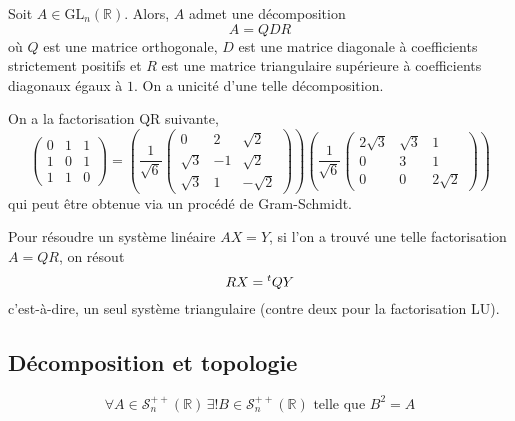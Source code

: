   \begin{corollary}
    Soit $A \in \mathrm{GL}_n(\mathbb{R})$. Alors, $A$ admet une décomposition
    \[ A = QDR \]
    où $Q$ est une matrice orthogonale, $D$ est une matrice diagonale à coefficients strictement positifs et $R$ est une matrice triangulaire supérieure à coefficients diagonaux égaux à $1$. On a unicité d'une telle décomposition.
  \end{corollary}
  
  
  \begin{example}
    On a la factorisation QR suivante,
    \[ \begin{pmatrix} 0 & 1 & 1 \\ 1 & 0 & 1 \\ 1 & 1 & 0 \end{pmatrix} = \left( \frac{1}{\sqrt{6}} \begin{pmatrix} 0 & 2 & \sqrt{2} \\ \sqrt{3} & -1 & \sqrt{2} \\ \sqrt{3} & 1 & -\sqrt{2} \end{pmatrix} \right) \left( \frac{1}{\sqrt{6}} \begin{pmatrix} 2\sqrt{3} & \sqrt{3} & 1 \\ 0 & 3 & 1 \\ 0 & 0 & 2\sqrt{2} \end{pmatrix} \right) \]
    qui peut être obtenue via un procédé de Gram-Schmidt.
  \end{example}
  
  
  \begin{remark}
    Pour résoudre un système linéaire $AX = Y$, si l'on a trouvé une telle factorisation $A = QR$, on résout
    \[ RX = \mathstrut ^t QY \]
    c'est-à-dire, un seul système triangulaire (contre deux pour la factorisation LU).
  \end{remark}
  
  \subsection{Décomposition et topologie}
  
  
  \begin{lemma}
    \[ \forall A \in \mathcal{S}_n^{++}(\mathbb{R}) \, \exists! B \in \mathcal{S}_n^{++}(\mathbb{R}) \text{ telle que } B^2 = A \]
  \end{lemma}
  
